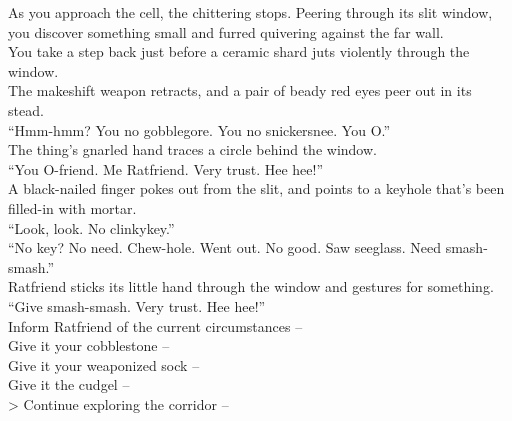As you approach the cell, the chittering stops. Peering through its slit window, you discover something small and furred quivering against the far wall.\\

You take a step back just before a ceramic shard juts violently through the window.\\

The makeshift weapon retracts, and a pair of beady red eyes peer out in its stead.\\
“Hmm-hmm? You no gobblegore. You no snickersnee. You O.”\\

The thing’s gnarled hand traces a circle behind the window.\\
“You O-friend. Me Ratfriend. Very trust. Hee hee!”\\

A black-nailed finger pokes out from the slit, and points to a keyhole that’s been filled-in with mortar.\\
“Look, look. No clinkykey.”\\

“No key? No need. Chew-hole. Went out. No good. Saw seeglass. Need smash-smash.”\\

Ratfriend sticks its little hand through the window and gestures for something.\\
“Give smash-smash. Very trust. Hee hee!”\\

 Inform Ratfriend of the current circumstances -- \\
 Give it your cobblestone -- \\
 Give it your weaponized sock -- \\
 Give it the cudgel -- \\
> Continue exploring the corridor -- 